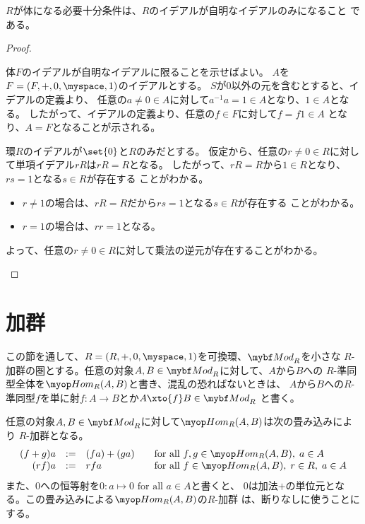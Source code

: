 {	\begin{proposition}[体とイデアル]\label{prop:体とイデアル} %
		$R$が体になる必要十分条件は、$R$のイデアルが自明なイデアルのみになること
		である。
	\end{proposition} %
	\begin{proof} 
	\begin{description}\setlength{\itemsep}{-1mm} %
		\item[必要] 体$F$のイデアルが自明なイデアルに限ることを示せばよい。
		$A$を$F=(F,+,0,\myspace,1)$のイデアルとする。
		$S$が$0$以外の元を含むとすると、イデアルの定義より、
		任意の$a\neq 0\in A$に対して$a^{-1}a=1\in A$となり、$1\in A$となる。
		したがって、イデアルの定義より、任意の$f\in F$に対して$f=f1\in A$
		となり、$A=F$となることが示される。
		\item[十分] 環$R$のイデアルが$\set{0}$と$R$のみだとする。
		仮定から、任意の$r\neq0\in R$に対して単項イデアル$rR$は$rR=R$となる。
		したがって、$rR=R$から$1\in R$となり、$rs=1$となる$s\in R$が存在する
		ことがわかる。
		\begin{itemize}\setlength{\itemsep}{-1mm} %
			\item $r\neq 1$の場合は、$rR=R$だから$rs=1$となる$s\in R$が存在する
			ことがわかる。
			\item $r=1$の場合は、$rr=1$となる。
		\end{itemize} %
		よって、任意の$r\neq0\in R$に対して乗法の逆元が存在することがわかる。
	\end{description} %
	\end{proof}
\section{加群}\label{s1:加群} %
	この節を通して、$R=(R,+,0,\myspace,1)$を可換環、$\Mod[R]$を小さな
	$R$-加群の圏とする。任意の対象$A,B\in\Mod[R]$に対して、$A$から$B$への
	$R$-準同型全体を$\Hom_R(A,B)$と書き、混乱の恐ればないときは、
	$A$から$B$への$R$-準同型$f$を単に射$f:A\to B$とか$A\xto{f}B\in\Mod[R]$
	と書く。

	任意の対象$A,B\in\Mod[R]$に対して$\Hom_R(A,B)$は次の畳み込みにより
	$R$-加群となる。
	\begin{equation*}\begin{array}{rcll}
		(f + g)a &:=&  (fa) + (ga)
			& \quad\text{for all } f,g\in\Hom_R(A,B),\; a\in A \\
		(rf)a &:=& rfa
			& \quad\text{for all } f\in\Hom_R(A,B),\; r\in R,\; a\in A \\
	\end{array}\end{equation*}
	また、$0$への恒等射を$0:a\mapsto 0\text{ for all }a\in A$と書くと、
	$0$は加法$+$の単位元となる。この畳み込みによる$\Hom_R(A,B)$の$R$-加群
	は、断りなしに使うことにする。

}
